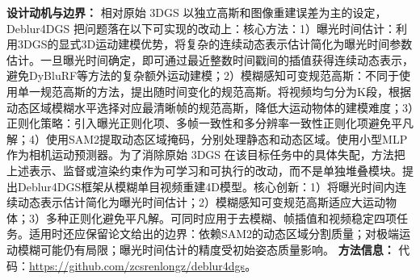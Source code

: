 \textbf{设计动机与边界：} 相对原始 3DGS 以独立高斯和图像重建误差为主的设定，Deblur4DGS 把问题落在以下可实现的改动上：核心方法：1）曝光时间估计：利用3DGS的显式3D运动建模优势，将复杂的连续动态表示估计简化为曝光时间参数估计。一旦曝光时间确定，即可通过最近整数时间戳间的插值获得连续动态表示，避免DyBluRF等方法的复杂额外运动建模；2）模糊感知可变规范高斯：不同于使用单一规范高斯的方法，提出随时间变化的规范高斯。将视频均匀分为K段，根据动态区域模糊水平选择对应最清晰帧的规范高斯，降低大运动物体的建模难度；3）正则化策略：引入曝光正则化项、多帧一致性和多分辨率一致性正则化项避免平凡解；4）使用SAM2提取动态区域掩码，分别处理静态和动态区域。使用小型MLP作为相机运动预测器。为了消除原始 3DGS 在该目标任务中的具体失配，方法把上述表示、监督或渲染约束作为可学习和可执行的改动，而不是单独堆叠模块。提出Deblur4DGS框架从模糊单目视频重建4D模型。核心创新：1）将曝光时间内连续动态表示估计简化为曝光时间估计；2）模糊感知可变规范高斯适应大运动物体；3）多种正则化避免平凡解。可同时应用于去模糊、帧插值和视频稳定四项任务。适用时还应保留论文给出的边界：依赖SAM2的动态区域分割质量；对极端运动模糊可能仍有局限；曝光时间估计的精度受初始姿态质量影响。
\textbf{方法信息：} 代码：\url{https://github.com/zcsrenlongz/deblur4dgs}。



